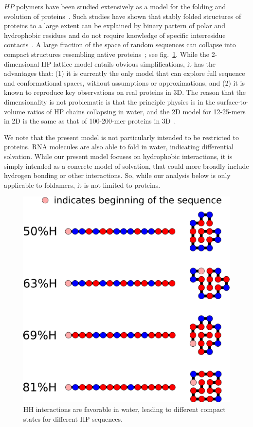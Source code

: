 \documentclass[journal=jacsat,manuscript=article,layout=twocolumn]{achemso}
\begin{document}
 $HP$ polymers have been studied extensively as a model for the folding and evolution of 
 proteins~\cite{lau1989lattice,Chan1991,Miller1995,Yue1995,agarwala1997local}.  Such studies have 
shown that stably folded structures of proteins to a large extent can be explained by binary 
pattern 
of polar and hydrophobic residues and do not require knowledge of specific interresidue 
contacts~\cite{Yue1992,Xiong1995,Fisher2011}. A large fraction of the space of random sequences can 
collapse into compact structures resembling native proteins~\cite{lau1989lattice}; see 
fig.~\ref{fig:hydro-effect}.  While the 2-dimensional HP lattice model entails obvious 
simplifications, it has the advantages that: (1) it is currently the only model that can explore 
full sequence and conformational spaces, without assumptions or approximations, and (2) it is known 
to reproduce key observations on real proteins in 3D.  The reason that the dimensionality is not 
problematic is that the principle physics is in the surface-to-volume ratios of HP chains 
collapsing 
in water, and the 2D model for 12-25-mers in 2D is the same as that of 100-200-mer proteins in 
3D~\cite{Giugliarelli2000}. 
 
  We note that the present model is not particularly intended to be restricted to proteins.  
  RNA molecules are also able to fold in water, indicating differential solvation.  While our 
present model focuses on hydrophobic interactions, it is simply intended as a concrete model of 
solvation, that could more broadly include hydrogen bonding or other interactions.  So, while our 
analysis below is only applicable to foldamers, it is not limited to proteins.
 

\begin{figure}[h!]
  \centering
  \includegraphics[width=\columnwidth]{pictures/tst-seqs.pdf} 
  \caption{\footnotesize{HH interactions are favorable in water, leading to different compact states 
for different 
HP sequences.}}
  \label{fig:hydro-effect}
\end{figure}
\end{document}
